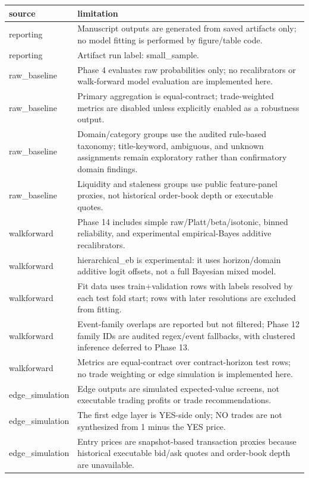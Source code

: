 \begin{tabular}{ll}
\toprule
source & limitation \\
\midrule
reporting & Manuscript outputs are generated from saved artifacts only; no model fitting is performed by figure/table code. \\
reporting & Artifact run label: small\_sample. \\
raw\_baseline & Phase 4 evaluates raw probabilities only; no recalibrators or walk-forward model evaluation are implemented here. \\
raw\_baseline & Primary aggregation is equal-contract; trade-weighted metrics are disabled unless explicitly enabled as a robustness output. \\
raw\_baseline & Domain/category groups use the audited rule-based taxonomy; title-keyword, ambiguous, and unknown assignments remain exploratory rather than confirmatory domain findings. \\
raw\_baseline & Liquidity and staleness groups use public feature-panel proxies, not historical order-book depth or executable quotes. \\
walkforward & Phase 14 includes simple raw/Platt/beta/isotonic, binned reliability, and experimental empirical-Bayes additive recalibrators. \\
walkforward & hierarchical\_eb is experimental: it uses horizon/domain additive logit offsets, not a full Bayesian mixed model. \\
walkforward & Fit data uses train+validation rows with labels resolved by each test fold start; rows with later resolutions are excluded from fitting. \\
walkforward & Event-family overlaps are reported but not filtered; Phase 12 family IDs are audited regex/event fallbacks, with clustered inference deferred to Phase 13. \\
walkforward & Metrics are equal-contract over contract-horizon test rows; no trade weighting or edge simulation is implemented here. \\
edge\_simulation & Edge outputs are simulated expected-value screens, not executable trading profits or trade recommendations. \\
edge\_simulation & The first edge layer is YES-side only; NO trades are not synthesized from 1 minus the YES price. \\
edge\_simulation & Entry prices are snapshot-based transaction proxies because historical executable bid/ask quotes and order-book depth are unavailable. \\

\end{tabular}
